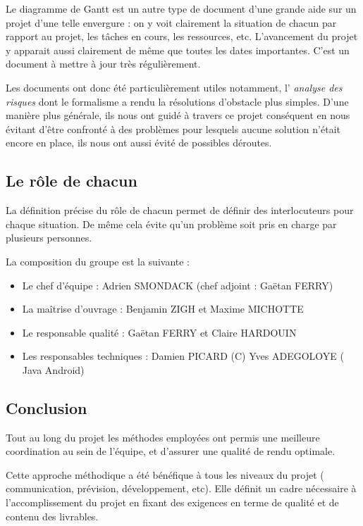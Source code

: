   Le diagramme de Gantt est un autre type de document d'une grande aide sur un
  projet d'une telle envergure : on y voit clairement la situation de chacun
  par rapport au projet, les tâches en cours, les ressources, etc.
  L'avancement du projet y apparait aussi clairement de même que toutes les
  dates importantes. C'est un document à mettre à jour très régulièrement.

  Les documents ont donc été particulièrement utiles notamment, l'\emph{
  analyse des risques} dont le formalisme a rendu la résolutions d'obstacle
  plus simples. D'une manière plus générale, ils nous ont guidé à travers ce
  projet conséquent en nous évitant d'être confronté à des problèmes pour
  lesquels aucune solution n'était encore en place, ils nous ont aussi évité
  de possibles déroutes.

\subsection{Le rôle de chacun}

  La définition précise du rôle de chacun permet de définir des interlocuteurs
  pour chaque situation. De même cela évite qu'un problème soit pris en charge
  par plusieurs personnes.

  La composition du groupe est la suivante :
  \begin{itemize}
    \item Le chef d'équipe : Adrien SMONDACK (chef adjoint : Gaëtan FERRY)
    \item La maîtrise d'ouvrage : Benjamin ZIGH et Maxime MICHOTTE
    \item Le responsable qualité : Gaëtan FERRY et Claire HARDOUIN
    \item Les responsables techniques : Damien PICARD (C) Yves ADEGOLOYE (
    Java Android)
  \end{itemize}


\subsection{Conclusion}

  Tout au long du projet les méthodes employées ont permis une meilleure
  coordination au sein de l'équipe, et d'assurer une qualité de rendu optimale.

  Cette approche méthodique a été bénéfique à tous les niveaux du projet (
  communication, prévision, développement, etc). Elle définit un cadre
  nécessaire à l'accomplissement du projet en fixant des exigences en terme de
  qualité et de contenu des livrables.

